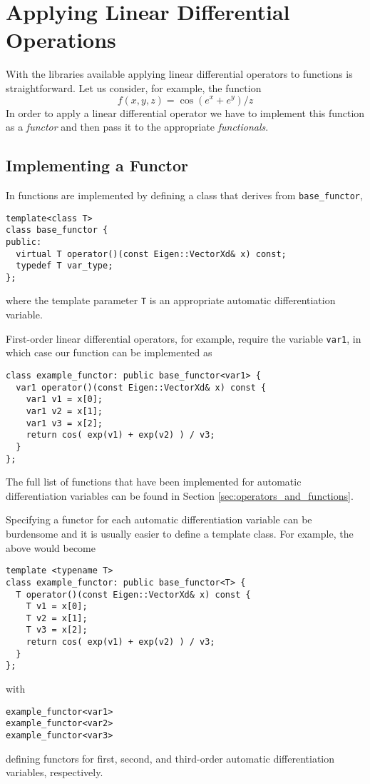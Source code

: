 \section{Applying Linear Differential Operations}

With the \nomad libraries available applying linear differential operators
to functions is straightforward.  Let us consider, for example, the
function
%
\begin{equation*}
f \! \left( x, y, z \right) = \cos \! \left( e^{x} + e^{y} \right) / z
\end{equation*}
%
In order to apply a linear differential operator we have to implement
this function as a \textit{functor} and then pass it to the appropriate
\textit{functionals}.

\subsection{Implementing a Functor}

In \nomad functions are implemented by defining a class
that derives from \verb|base_functor|,
%
\begin{verbatim}
template<class T>
class base_functor {
public:
  virtual T operator()(const Eigen::VectorXd& x) const;
  typedef T var_type;
};
\end{verbatim}
%
where the template parameter \verb|T| is an appropriate automatic 
differentiation variable.  

First-order linear differential operators, for example, require the 
variable \verb|var1|, in which case our function can be implemented as
%
\begin{verbatim}
class example_functor: public base_functor<var1> {
  var1 operator()(const Eigen::VectorXd& x) const {
    var1 v1 = x[0];
    var1 v2 = x[1];
    var1 v3 = x[2];
    return cos( exp(v1) + exp(v2) ) / v3;  
  }
};
\end{verbatim}
%
The full list of functions that have been implemented for automatic
differentiation variables can be found in Section \ref{sec:operators_and_functions}.

Specifying a functor for each automatic differentiation variable 
can be burdensome and it is usually easier to define a template class.  
For example, the above would become
%
\begin{verbatim}
template <typename T>
class example_functor: public base_functor<T> {
  T operator()(const Eigen::VectorXd& x) const {
    T v1 = x[0];
    T v2 = x[1];
    T v3 = x[2];
    return cos( exp(v1) + exp(v2) ) / v3;  
  }
};
\end{verbatim}
%
with
%
\begin{verbatim}
example_functor<var1>
example_functor<var2>
example_functor<var3>
\end{verbatim}
%
defining functors for first, second, and third-order automatic differentiation
variables, respectively.

